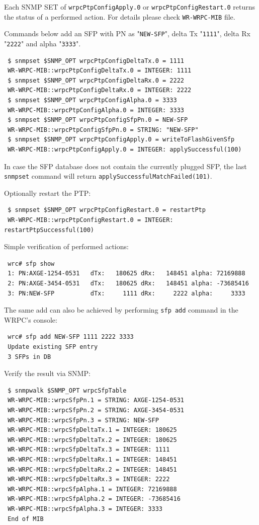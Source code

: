 \documentclass[a4paper, 12pt]{article}
\begin{document}
Each SNMP SET of \texttt{wrpcPtpConfigApply.0} or \texttt{wrpcPtpConfigRestart.0} returns
the status of a performed action. For details please check \texttt{WR-WRPC-MIB}
file.

Commands below add an SFP with PN as "\texttt{NEW-SFP}", delta Tx "\texttt{1111}",
delta Rx "\texttt{2222}" and alpha "\texttt{3333}".
\begin{lstlisting}
 $ snmpset $SNMP_OPT wrpcPtpConfigDeltaTx.0 = 1111
 WR-WRPC-MIB::wrpcPtpConfigDeltaTx.0 = INTEGER: 1111
 $ snmpset $SNMP_OPT wrpcPtpConfigDeltaRx.0 = 2222
 WR-WRPC-MIB::wrpcPtpConfigDeltaRx.0 = INTEGER: 2222
 $ snmpset $SNMP_OPT wrpcPtpConfigAlpha.0 = 3333
 WR-WRPC-MIB::wrpcPtpConfigAlpha.0 = INTEGER: 3333
 $ snmpset $SNMP_OPT wrpcPtpConfigSfpPn.0 = NEW-SFP
 WR-WRPC-MIB::wrpcPtpConfigSfpPn.0 = STRING: "NEW-SFP"
 $ snmpset $SNMP_OPT wrpcPtpConfigApply.0 = writeToFlashGivenSfp
 WR-WRPC-MIB::wrpcPtpConfigApply.0 = INTEGER: applySuccessful(100)
\end{lstlisting}

In case the SFP database does not contain the currently plugged SFP, the last
\texttt{snmpset} command will return \texttt{applySuccessfulMatchFailed(101)}.

Optionally restart the PTP:
\begin{lstlisting}
 $ snmpset $SNMP_OPT wrpcPtpConfigRestart.0 = restartPtp
 WR-WRPC-MIB::wrpcPtpConfigRestart.0 = INTEGER: restartPtpSuccessful(100)
\end{lstlisting}

Simple verification of performed actions:
\begin{lstlisting}
 wrc# sfp show
 1: PN:AXGE-1254-0531   dTx:   180625 dRx:   148451 alpha: 72169888
 2: PN:AXGE-3454-0531   dTx:   180625 dRx:   148451 alpha: -73685416
 3: PN:NEW-SFP          dTx:     1111 dRx:     2222 alpha:     3333
\end{lstlisting}

The same add can also be achieved by performing \texttt{sfp add} command in
the WRPC's console:
\begin{lstlisting}
 wrc# sfp add NEW-SFP 1111 2222 3333
 Update existing SFP entry
 3 SFPs in DB
\end{lstlisting}

Verify the result via SNMP:
\begin{lstlisting}
 $ snmpwalk $SNMP_OPT wrpcSfpTable
 WR-WRPC-MIB::wrpcSfpPn.1 = STRING: AXGE-1254-0531
 WR-WRPC-MIB::wrpcSfpPn.2 = STRING: AXGE-3454-0531
 WR-WRPC-MIB::wrpcSfpPn.3 = STRING: NEW-SFP
 WR-WRPC-MIB::wrpcSfpDeltaTx.1 = INTEGER: 180625
 WR-WRPC-MIB::wrpcSfpDeltaTx.2 = INTEGER: 180625
 WR-WRPC-MIB::wrpcSfpDeltaTx.3 = INTEGER: 1111
 WR-WRPC-MIB::wrpcSfpDeltaRx.1 = INTEGER: 148451
 WR-WRPC-MIB::wrpcSfpDeltaRx.2 = INTEGER: 148451
 WR-WRPC-MIB::wrpcSfpDeltaRx.3 = INTEGER: 2222
 WR-WRPC-MIB::wrpcSfpAlpha.1 = INTEGER: 72169888
 WR-WRPC-MIB::wrpcSfpAlpha.2 = INTEGER: -73685416
 WR-WRPC-MIB::wrpcSfpAlpha.3 = INTEGER: 3333
 End of MIB
\end{lstlisting}
\end{document}
